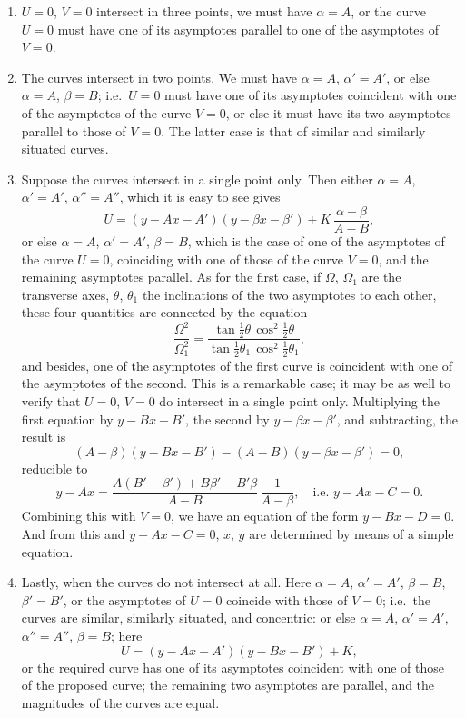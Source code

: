 \documentclass[11pt]{article}
\begin{document}
\begin{enumerate}
\item[(1)] $U = 0$, $V = 0$ intersect in three points, we must have $\alpha = A$, or the curve $U = 0$ must have one of its asymptotes parallel to one of the asymptotes of $V = 0$.

\item[(2)] The curves intersect in two points. We must have $\alpha = A$, $\alpha' = A'$, or else $\alpha = A$, $\beta = B$; i.e.\ $U = 0$ must have one of its asymptotes coincident with one of the asymptotes of the curve $V = 0$, or else it must have its two asymptotes parallel to those of $V = 0$. The latter case is that of similar and similarly situated curves.

\item[(3)] Suppose the curves intersect in a single point only. Then either $\alpha = A$, $\alpha' = A'$, $\alpha'' = A''$, which it is easy to see gives
\[
U = (y - A x - A')(y - \beta x - \beta') + K\,\frac{\alpha - \beta}{A - B},
\]
or else $\alpha = A$, $\alpha' = A'$, $\beta = B$, which is the case of one of the asymptotes of the curve $U = 0$, coinciding with one of those of the curve $V = 0$, and the remaining asymptotes parallel. As for the first case, if $\Omega$, $\Omega_1$ are the transverse axes, $\theta$, $\theta_1$ the inclinations of the two asymptotes to each other, these four quantities are connected by the equation
\[
\frac{\Omega^2}{\Omega_1^2} = \frac{\tan\tfrac12\theta\,\cos^2\tfrac12\theta}{\tan\tfrac12\theta_1\,\cos^2\tfrac12\theta_1},
\]
and besides, one of the asymptotes of the first curve is coincident with one of the asymptotes of the second. This is a remarkable case; it may be as well to verify that $U = 0$, $V = 0$ do intersect in a single point only. Multiplying the first equation by $y - B x - B'$, the second by $y - \beta x - \beta'$, and subtracting, the result is
\[
(A - \beta)(y - B x - B') - (A - B)(y - \beta x - \beta') = 0,
\]
reducible to
\[
y - A x = \frac{A(B' - \beta') + B\beta' - B'\beta}{A - B}\,\frac{1}{A - \beta},\quad\text{i.e. } y - A x - C = 0.
\]
Combining this with $V = 0$, we have an equation of the form $y - B x - D = 0$. And from this and $y - A x - C = 0$, $x$, $y$ are determined by means of a simple equation.

\item[(4)] Lastly, when the curves do not intersect at all. Here $\alpha = A$, $\alpha' = A'$, $\beta = B$, $\beta' = B'$, or the asymptotes of $U = 0$ coincide with those of $V = 0$; i.e.\ the curves are similar, similarly situated, and concentric: or else $\alpha = A$, $\alpha' = A'$, $\alpha'' = A''$, $\beta = B$; here
\[
U = (y - A x - A')(y - B x - B') + K,
\]
or the required curve has one of its asymptotes coincident with one of those of the proposed curve; the remaining two asymptotes are parallel, and the magnitudes of the curves are equal.
\end{enumerate}
\end{document}

